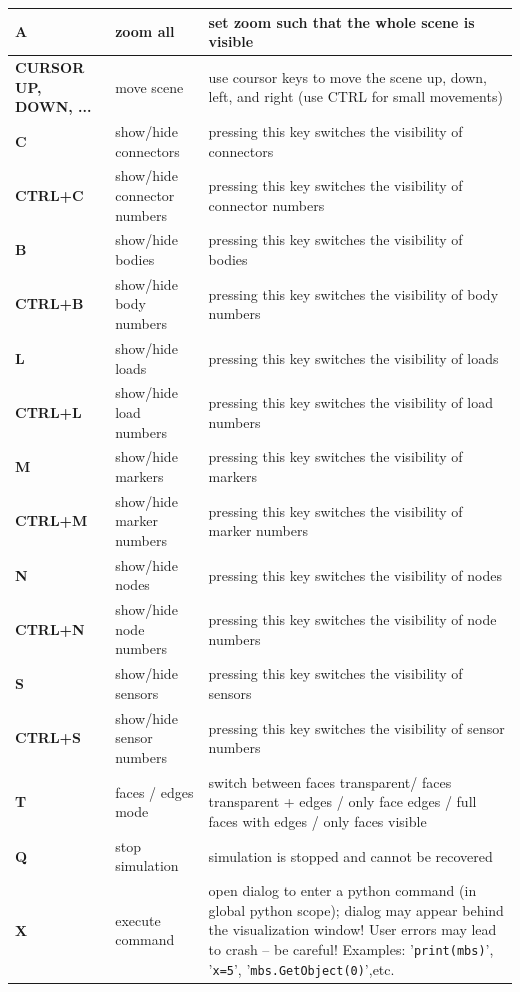 \documentclass[11pt,a4paper]{book}
\begin{document}
\begin{center}
\begin{longtable}{| p{4cm} | p{4cm} | p{8cm} |}
  \bf A & zoom all & set zoom such that the whole scene is visible \\ \hline
  \bf CURSOR UP, DOWN, ... & move scene& use coursor keys to move the scene up, down, left, and right (use CTRL for small movements)\\ \hline
  \bf C & show/hide connectors & pressing this key switches the visibility of connectors \\ \hline
  \bf CTRL+C & show/hide connector numbers & pressing this key switches the visibility of connector numbers \\ \hline
	\bf B & show/hide bodies & pressing this key switches the visibility of bodies \\ \hline
  \bf CTRL+B & show/hide body numbers & pressing this key switches the visibility of body numbers \\ \hline
	\bf L & show/hide loads & pressing this key switches the visibility of loads \\ \hline
  \bf CTRL+L & show/hide load numbers & pressing this key switches the visibility of load numbers \\ \hline
	\bf M & show/hide markers & pressing this key switches the visibility of markers \\ \hline
  \bf CTRL+M & show/hide marker numbers & pressing this key switches the visibility of marker numbers \\ \hline
	\bf N & show/hide nodes & pressing this key switches the visibility of nodes \\ \hline
  \bf CTRL+N & show/hide node numbers & pressing this key switches the visibility of node numbers \\ \hline
	\bf S & show/hide sensors & pressing this key switches the visibility of sensors \\ \hline
  \bf CTRL+S & show/hide sensor numbers & pressing this key switches the visibility of sensor numbers \\ \hline
	\bf T & faces / edges mode & switch between faces transparent/ faces transparent + edges / only face edges / full faces with edges / only faces visible \\ \hline
	\bf Q & stop simulation & simulation is stopped and cannot be recovered \\ \hline
	\bf X & execute command & open dialog to enter a python command (in global python scope); dialog may appear behind the visualization window! User errors may lead to crash -- be careful! 
	Examples: '\texttt{print(mbs)}', '\texttt{x=5}', '\texttt{mbs.GetObject(0)}',etc.\\ \hline

\end{longtable}
\end{center}
\end{document}
